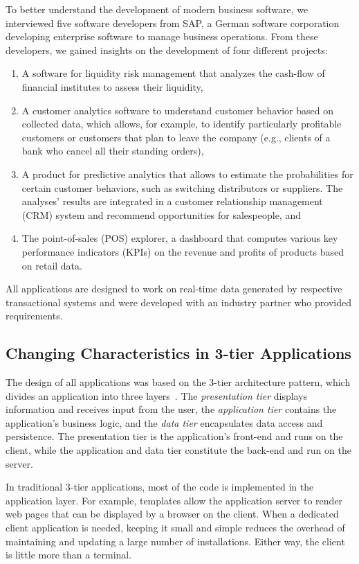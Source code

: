 \tmpStart
To better understand the development of modern business software, we interviewed five software developers from SAP, a German software corporation developing enterprise software to manage business operations.
From these developers, we gained insights on the development of four different projects:
\begin{enumerate}
	\item A software for liquidity risk management that analyzes the cash-flow of financial institutes to assess their liquidity,
	\item A customer analytics software to understand customer behavior based on collected data, which allows, for example, to identify particularly profitable customers or customers that plan to leave the company (e.g., clients of a bank who cancel all their standing orders),
	\item A product for predictive analytics that allows to estimate the probabilities for certain customer behaviors, such as switching distributors or suppliers. The analyses' results are integrated in a customer relationship management (CRM) system and recommend opportunities for salespeople, and
	\item The point-of-sales (POS) explorer, a dashboard that computes various key performance indicators (KPIs) on the revenue and profits of products based on retail data.
\end{enumerate}
%
All applications are designed to work on real-time data generated by respective transactional systems and were developed with an industry partner who provided requirements.

\subsection{Changing Characteristics in 3-tier Applications}

The design of all applications was based on the 3-tier architecture pattern, which divides an application into three layers~\cite{eckerson95:three_tier_clientserver_architecture}.
The \emph{presentation tier} displays information and receives input from the user,
the \emph{application tier} contains the application's business logic, and
the \emph{data tier} encapsulates data access and persistence.
The presentation tier is the application's front-end and runs on the client, while the application and data tier constitute the back-end and run on the server.

In traditional 3-tier applications, most of the code is implemented in the application layer.
For example, templates allow the application server to render web pages that can be displayed by a browser on the client.
When a dedicated client application is needed, keeping it small and simple reduces the overhead of maintaining and updating a large number of installations.
Either way, the client is little more than a terminal.

